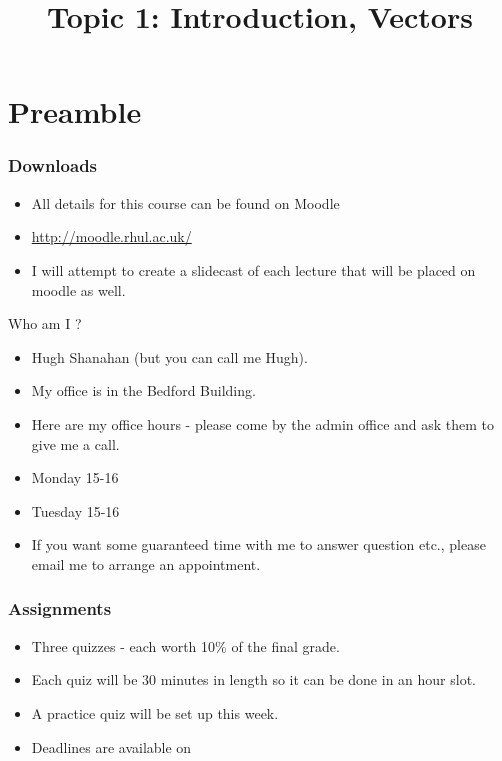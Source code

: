 \documentclass[hyperref={colorlinks=true},xcolor=svgnames]{beamer}
\title{Topic 1: Introduction, Vectors}
\begin{document}
\begin{frame}
  \titlepage
\end{frame}

\section{Preamble}
\begin{frame}
\frametitle{Downloads}
\begin{itemize}
\item
All details for this course can be found on Moodle

\item
\url{http://moodle.rhul.ac.uk/}

\item
I will attempt to create a slidecast of each lecture that will be placed on moodle as well.
\end{itemize}

\end{frame}

\begin{frame}{Who am I ?}
\begin{itemize}
\item
Hugh Shanahan (but you can call me Hugh).

\item 
My office is in the Bedford Building. 

\item
Here are my office hours - please come by the admin office and ask them to give me a call.

\item Monday 15-16

\item Tuesday 15-16

\item 
If you want some guaranteed time with me to answer question etc., 
please email me to arrange an appointment. 
\end{itemize}
\end{frame}

\begin{frame}
\frametitle{Assignments}
\begin{itemize}
\item 
Three quizzes - each worth 10\% of the final grade. 

\item 
Each quiz will be 30 minutes in length so it can be done in an hour slot.

\item A practice quiz will be set up this week.

\item 
Deadlines are available on 




\end{itemize}
\end{frame}
\end{document}
